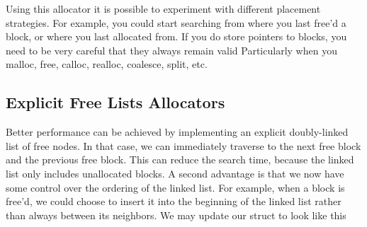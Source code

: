 Using this allocator it is possible to experiment with different placement strategies.
For example, you could start searching from where you last free'd a block, or where you last allocated from.
If you do store pointers to blocks, you need to be very careful that they always remain valid
Particularly when you malloc, free, calloc, realloc, coalesce, split, etc.

\subsection{Explicit Free Lists Allocators}

Better performance can be achieved by implementing an explicit doubly-linked list of free nodes.
In that case, we can immediately traverse to the next free block and the previous free block.
This can reduce the search time, because the linked list only includes unallocated blocks.
A second advantage is that we now have some control over the ordering of the linked list.
For example, when a block is free'd, we could choose to insert it into the beginning of the linked list rather than always between its neighbors.
We may update our struct to look like this

